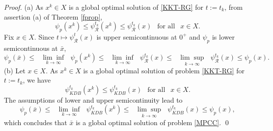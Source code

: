 \begin{proof}
 (a) As $x^{k}\in X$ is a global optimal solution of \eqref{KKT-RG} for $t:=t_k$, from assertion (a) of Theorem \ref{fprop}, 
	\[
	\psi_{p}(x^{k})\leq\psi_{\mathcal{R}}^{t_{k}}(x^{k})\leq\psi_{\mathcal{R}}^{t_{k}}(x)\;\, \mbox{ for all }\;\, x\in X.
	\]
	 Fix $x\in X$. Since $t\mapsto \psi_{\mathcal{R}}^{t}(x)$ is upper semicontinuous at $0^+$ and $\psi_{p}$ is lower semicontinuous at $\bar{x}$, 
	\begin{equation*}
	\psi_{p}(\bar{x})\leq\text{ }\underset{k\rightarrow\infty}{\lim\inf}\text{ }\psi
	_{p}(x^{k})\leq\text{ }\underset{k\rightarrow\infty}{\lim\inf}\text{ }\psi_{\mathcal{R}}^{t_{k}
	}(x)\leq\text{ }\underset{k\rightarrow\infty}{\lim\sup}\text{ }\psi_{\mathcal{R}}^{t_{k}}
	(x)\leq\psi_{p}(x).
	\end{equation*}
(b) Let $x\in X$.	As $x^{k}\in X$ is a
	global optimal solution of problem \eqref{KKT-RG} for $t:=t_k$, we have
	\[
	\psi_{KDB}^{t_{k}}(x^{k})\leq\psi_{KDB}^{t_{k}}(x)\;\, \mbox{ for all }\;\, x\in X.
	\]
	The assumptions of lower and upper semicontinuity lead to 
	\begin{equation*}
	\psi_{p}(\bar{x})\leq \text{ }\underset{k\rightarrow\infty}{\lim\inf}\text{ }\psi_{KDB}^{t_{k}
	}(x^{k})\leq\text{ }\underset{k\rightarrow\infty}{\lim\sup}\text{ }\psi_{KDB}^{t_{k}}
	(x)\leq\psi_{p}(x),
	\end{equation*} 
   {which concludes that $\bar{x}$ is a global optimal solution of problem \eqref{MPCC}}. \hfill \qed
\end{proof}

